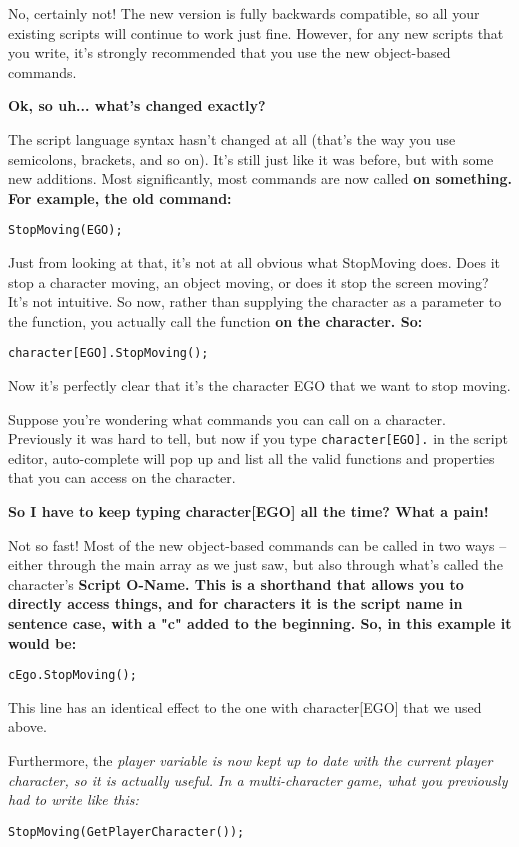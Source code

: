 No, certainly not! The new version is fully backwards compatible, so all your existing
scripts will continue to work just fine. However, for any new scripts that you write,
it's strongly recommended that you use the new object-based commands.

\bf{Ok, so uh... what's changed exactly?}

The script language syntax hasn't changed at all (that's the way you use semicolons, brackets,
and so on). It's still just like it was before, but with some new additions. Most
significantly, most commands are now called \bf{on something}. For example, the old
command:

\verb$StopMoving(EGO);$

Just from looking at that, it's not at all obvious what StopMoving does. Does it stop
a character moving, an object moving, or does it stop the screen moving? It's not intuitive.
So now, rather than supplying the character as a parameter to the function, you actually
call the function \bf{on} the character. So:

\verb$character[EGO].StopMoving();$

Now it's perfectly clear that it's the character EGO that we want to stop moving.

Suppose you're wondering what commands you can call on a character. Previously it was hard
to tell, but now if you type  \verb$character[EGO].$  in the script editor, auto-complete will
pop up and list all the valid functions and properties that you can access on the character.

\bf{So I have to keep typing character[EGO] all the time? What a pain!}

Not so fast! Most of the new object-based commands can be called in two ways -- either
through the main array as we just saw, but also through what's called the character's
\bf{Script O-Name}. This is a shorthand that allows you to directly access things, and
for characters it is the script name in sentence case, with a "c" added to the beginning.
So, in this example it would be:

\verb$cEgo.StopMoving();$

This line has an identical effect to the one with character[EGO] that we used above.

Furthermore, the \it{player} variable is now kept up to date with the current player
character, so it is actually useful. In a multi-character game, what you previously had
to write like this:

\verb$StopMoving(GetPlayerCharacter());$

